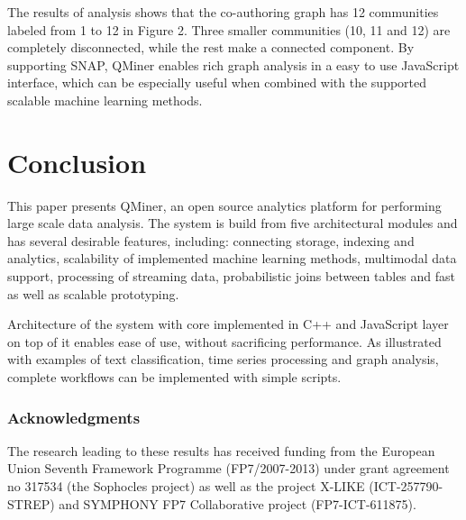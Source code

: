 \documentclass{article} %
\begin{document}
The results of analysis shows that the co-authoring graph has 12 communities labeled from 1 to 12 in Figure 2. Three smaller communities (10, 11 and 12) are completely disconnected, while the rest make a connected component. By supporting SNAP, QMiner enables rich graph analysis in a easy to use JavaScript interface, which can be especially useful when combined with the supported scalable machine learning methods.

\section{Conclusion}

This paper presents QMiner, an open source analytics platform for performing large scale data analysis. The system is build from five architectural modules and has several desirable features, including: connecting storage, indexing and analytics, scalability of implemented machine learning methods, multimodal data support, processing of streaming data, probabilistic joins between tables and fast as well as scalable prototyping.

Architecture of the system with core implemented in C++ and JavaScript layer on top of it enables ease of use, without sacrificing performance. As illustrated with examples of text classification, time series processing and graph analysis, complete workflows can be implemented with simple scripts.

\subsubsection*{Acknowledgments}
The research leading to these results has received funding from the European Union Seventh Framework Programme (FP7/2007-2013) under grant agreement no 317534 (the Sophocles project) as well as the project X-LIKE (ICT-257790-STREP) and SYMPHONY FP7 Collaborative project (FP7-ICT-611875).



\end{document}
